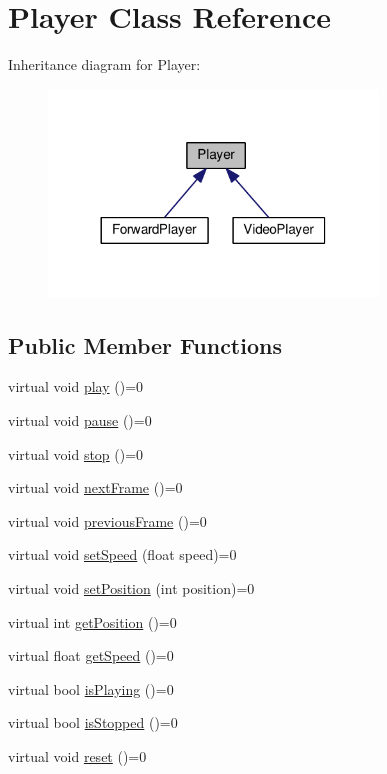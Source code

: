 \hypertarget{classGUI_1_1Player}{}\section{Player Class Reference}
\label{classGUI_1_1Player}


Inheritance diagram for Player\+:
\nopagebreak
\begin{figure}[H]
\begin{center}
\leavevmode
\includegraphics[width=248pt]{classGUI_1_1Player__inherit__graph}
\end{center}
\end{figure}
\subsection*{Public Member Functions}
\begin{DoxyCompactItemize}
\item 
virtual void \hyperlink{classGUI_1_1Player_aa3c4df4568ad2126665a07db4e1f59b6}{play} ()=0
\item 
virtual void \hyperlink{classGUI_1_1Player_a0edeed26c37624e7aa90f391c9a7128f}{pause} ()=0
\item 
virtual void \hyperlink{classGUI_1_1Player_a7a0e5d7c45657ca21b5b8d0d4b0a0e7b}{stop} ()=0
\item 
virtual void \hyperlink{classGUI_1_1Player_af64b0827c381fcd751fe2bbbf38682f4}{next\+Frame} ()=0
\item 
virtual void \hyperlink{classGUI_1_1Player_a4db6c8b8c8e9b567d466181337cdc001}{previous\+Frame} ()=0
\item 
virtual void \hyperlink{classGUI_1_1Player_a1c7d2ab9f6c21f2e7bf15a2ec9841a0a}{set\+Speed} (float speed)=0
\item 
virtual void \hyperlink{classGUI_1_1Player_acf5fb178b5d9a7f5f4bd198a13ae6bf7}{set\+Position} (int position)=0
\item 
virtual int \hyperlink{classGUI_1_1Player_a889dbfa5524d69dcc31d377d2d9bd230}{get\+Position} ()=0
\item 
virtual float \hyperlink{classGUI_1_1Player_a349fa93e666bd9fb256a238a3194f948}{get\+Speed} ()=0
\item 
virtual bool \hyperlink{classGUI_1_1Player_a4fbad8972dd248e6c8f5dc2c898a9bc7}{is\+Playing} ()=0
\item 
virtual bool \hyperlink{classGUI_1_1Player_ab9e7bd794ed42cea965c5250ec804225}{is\+Stopped} ()=0
\item 
virtual void \hyperlink{classGUI_1_1Player_a00af5c2c5e03cb5748a94d936fe34d9a}{reset} ()=0
\end{DoxyCompactItemize}
